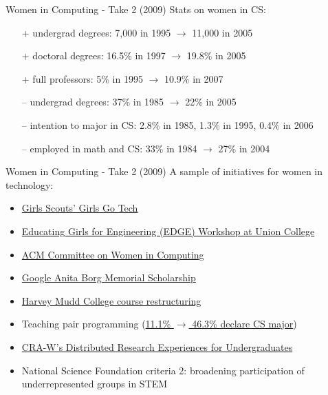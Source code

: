 \documentclass{beamer}
\begin{document}
\begin{frame}{Women in Computing - Take 2 (2009)}
Stats on women in CS:
\begin{itemize}
\item[+] undergrad degrees: 7,000 in 1995 $\rightarrow$ 11,000 in 2005
\item[+] doctoral degrees: 16.5\% in 1997 $\rightarrow$ 19.8\% in 2005
\item[+] full professors: 5\% in 1995 $\rightarrow$ 10.9\% in 2007
\pause
\item[--] undergrad degrees: 37\% in 1985 $\rightarrow$ 22\% in 2005
\item[--] intention to major in CS: 2.8\% in 1985, 1.3\% in 1995, 0.4\% in 2006
\item[--] employed in math and CS: 33\% in 1984 $\rightarrow$ 27\% in 2004
\end{itemize}
\end{frame}

\begin{frame}{Women in Computing - Take 2 (2009)}
A sample of initiatives for women in technology:
\begin{itemize}
\item \href{http://girlsgotech.org}{Girls Scouts' Girls Go Tech}
\item \href{http://engineering.union.edu/edge/}{Educating Girls for Engineering (EDGE) Workshop at Union College}
\item \href{http://women.acm.org/}{ACM Committee on Women in Computing}
\item \href{http://www.google.com/anitaborg/}{Google Anita Borg Memorial Scholarship}
\item \href{http://dx.doi.org/10.1145/1734263.1734281}{Harvey Mudd College course restructuring}
\item Teaching pair programming (\href{http://cacm.acm.org/magazines/2006/8/5850/fulltext}{11.1\% $\rightarrow$ 46.3\% declare CS major})
\item \href{http://cra-w.org/dreu}{CRA-W's Distributed Research Experiences for Undergraduates}
\item National Science Foundation criteria 2: broadening participation of underrepresented groups in STEM
\end{itemize}
\end{frame}
\end{document}
